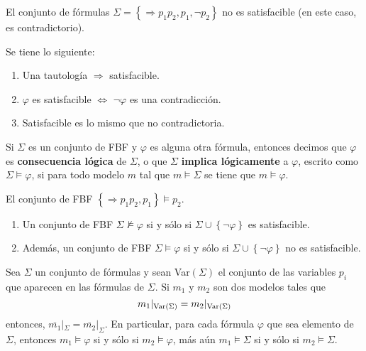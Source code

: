 \documentclass[12pt]{report}
\newcounter{it}
\theoremstyle{largebreak}
\begin{document}
    \begin{exa}
        El conjunto de fórmulas $\Sigma=\left\{\Rightarrow p_1p_2, p_1,\neg p_2 \right\}$ no es satisfacible (en este caso, es contradictorio).
    \end{exa}

    \begin{obs}
        Se tiene lo siguiente:
        \begin{enumerate}
            \item Una tautología $\Rightarrow$ satisfacible.
            \item $\varphi$ es satisfacible $\iff$ $\neg\varphi$ es una contradicción.
            \item Satisfacible es lo mismo que no contradictoria.
        \end{enumerate}
    \end{obs}

    \begin{mydef}
        Si $\Sigma$ es un conjunto de FBF y $\varphi$ es alguna otra fórmula, entonces decimos que $\varphi$ es \textbf{consecuencia lógica} de $\Sigma$, o que $\Sigma$ \textbf{implica lógicamente} a $\varphi$, escrito como $\Sigma\vDash\varphi$, si para todo modelo $m$ tal que $m\vDash\Sigma$ se tiene que $m\vDash\varphi$.
    \end{mydef}

    \begin{exa}
        El conjunto  de FBF $\left\{\Rightarrow p_1 p_2, p_1\right\}\vDash p_2$.
    \end{exa}

    \begin{obs}
        \begin{enumerate}
            Se tiene lo siguiente:
            \item Un conjunto de FBF $\Sigma\nvDash\varphi$ si y sólo si $\Sigma\cup\left\{\neg\varphi \right\}$ es satisfacible.
            \item Además, un conjunto de FBF $\Sigma\vDash\varphi$ si y sólo si $\Sigma\cup\left\{\neg\varphi \right\}$ no es satisfacible.
        \end{enumerate}
    \end{obs}

    \begin{lema}
        Sea $\Sigma$ un conjunto de fórmulas y sean Var$(\Sigma)$ el conjunto de las variables $p_i$ que aparecen en las fórmulas de $\Sigma$. Si $m_1$ y $m_2$ son dos modelos tales que
        \begin{equation*}
            m_1|_{\textup{Var}(\Sigma)}=m_2|_{\textup{Var}(\Sigma)}
        \end{equation*}
        entonces, $\overline{m_1}|_{\Sigma}=\overline{m_2}|_{\Sigma}$. En particular, para cada fórmula $\varphi$ que sea elemento de $\Sigma$, entonces $m_1\vDash\varphi$ si y sólo si $m_2\vDash\varphi$, más aún $m_1\vDash\Sigma$ si y sólo si $m_2\vDash\Sigma$.
    \end{lema}
\end{document}
